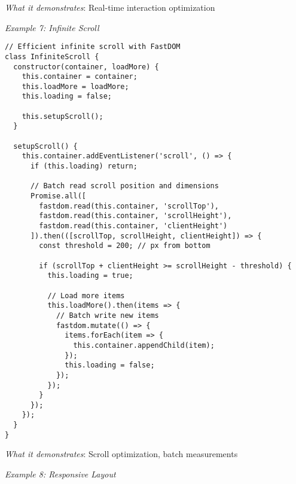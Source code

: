 \documentclass[11pt]{article}
\begin{document}
\emph{What it demonstrates}: Real-time interaction optimization

\emph{Example 7: Infinite Scroll}

\begin{verbatim}
// Efficient infinite scroll with FastDOM
class InfiniteScroll {
  constructor(container, loadMore) {
    this.container = container;
    this.loadMore = loadMore;
    this.loading = false;
    
    this.setupScroll();
  }
  
  setupScroll() {
    this.container.addEventListener('scroll', () => {
      if (this.loading) return;
      
      // Batch read scroll position and dimensions
      Promise.all([
        fastdom.read(this.container, 'scrollTop'),
        fastdom.read(this.container, 'scrollHeight'),
        fastdom.read(this.container, 'clientHeight')
      ]).then(([scrollTop, scrollHeight, clientHeight]) => {
        const threshold = 200; // px from bottom
        
        if (scrollTop + clientHeight >= scrollHeight - threshold) {
          this.loading = true;
          
          // Load more items
          this.loadMore().then(items => {
            // Batch write new items
            fastdom.mutate(() => {
              items.forEach(item => {
                this.container.appendChild(item);
              });
              this.loading = false;
            });
          });
        }
      });
    });
  }
}
\end{verbatim}

\emph{What it demonstrates}: Scroll optimization, batch measurements

\emph{Example 8: Responsive Layout}
\end{document}
